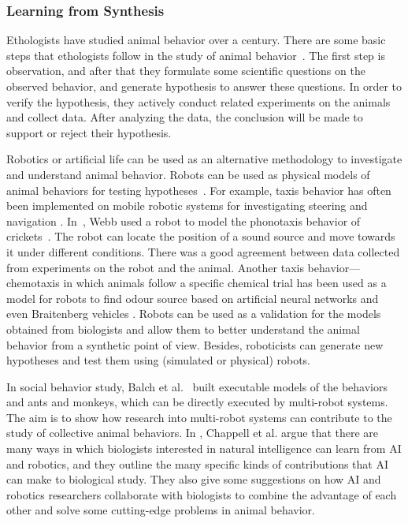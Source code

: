 \subsubsection{Learning from Synthesis}

Ethologists have studied animal behavior over a century. There are some basic steps that ethologists follow in the study of animal behavior~\cite{camazine2003self}. The first step is observation, and after that they formulate some scientific questions on the observed behavior, and generate hypothesis to answer these questions. In order to verify the hypothesis, they actively conduct related experiments on the animals and collect data. After analyzing the data, the conclusion will be made to support or reject their hypothesis.

Robotics or artificial life can be used as an alternative methodology to investigate and understand animal behavior. Robots can be used as physical models of animal behaviors for testing hypotheses~\citep{Barbara_2000, Meyer2008}. For example, taxis behavior has often been implemented on mobile robotic systems for investigating steering and navigation \cite{Ignacio2009}. In~\citep{Barbara_1995}, Webb used a robot to model the phonotaxis behavior of crickets~\citep{Popov:JCP:1997}. The robot can locate the position of a sound source and move towards it under different conditions. There was a good agreement between data collected from experiments on the robot and the animal. Another taxis behavior---chemotaxis in which animals follow a specific chemical trial has been used as a model for robots to find odour source based on artificial neural networks \cite{Farah_2002} and even Braitenberg vehicles \cite{Lilienthal_2003}. Robots can be used as a validation for the models obtained from biologists and allow them to better understand the animal behavior from a synthetic point of view. Besides, roboticists can generate new hypotheses and test them using (simulated or physical) robots.

In social behavior study, Balch et al.~\citep{Balch_2006} built executable models of the behaviors and ants and monkeys, which can be directly executed by multi-robot systems. The aim is to show how research into multi-robot systems can contribute to the study of collective animal behaviors. In \cite{Chappell_2010}, Chappell et al. argue that there are many ways in which biologists interested in natural intelligence can learn from AI and robotics, and they outline the many specific kinds of contributions that AI can make to biological study. They also give some suggestions on how AI and robotics researchers collaborate with biologists to combine the advantage of each other and solve some cutting-edge problems in animal behavior.

